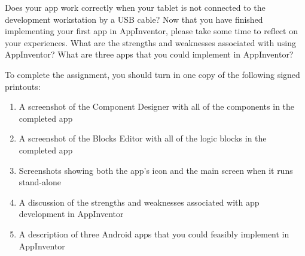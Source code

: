 Does your app work correctly when your tablet is not connected to the development workstation by a USB cable? Now that
you have finished implementing your first app in AppInventor, please take some time to reflect on your experiences.
What are the strengths and weaknesses associated with using AppInventor? What are three apps that you could implement in
AppInventor?


\vspace*{.05in}
\noindent
To complete the assignment, you should turn in one copy of the following signed printouts: 
\vspace*{-.06in}

\begin{enumerate}
	\itemsep0em
	\item A screenshot of the Component Designer with all of the components in the completed app
	\item A screenshot of the Blocks Editor with all of the logic blocks in the completed app 
	\item Screenshots showing both the app's icon and the main screen when it runs stand-alone
	\item A discussion of the strengths and weaknesses associated with app development in AppInventor
	\item A description of three Android apps that you could feasibly implement in AppInventor
\end{enumerate}

% 
% 		
% 
% 
% 
% 
% 

